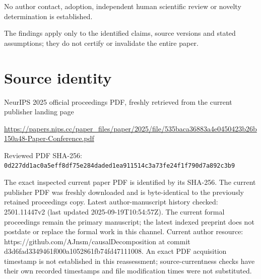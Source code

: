 \documentclass[11pt]{article}
\begin{document}
No author contact, adoption, independent human scientific review or novelty determination is established.\par

The findings apply only to the identified claims, source versions and stated assumptions; they do not certify or invalidate the entire paper.\par

\section*{Source identity}

NeurIPS 2025 official proceedings PDF, freshly retrieved from the current publisher landing page

\url{https://papers.nips.cc/paper_files/paper/2025/file/535baca36883a4e0450423b26b150a48-Paper-Conference.pdf}

Reviewed PDF SHA-256: \nolinkurl{0d227dd1ac0a5eff8df75e284daded1ea911514c3a73fe24f1f790d7a892c3b9}

The exact inspected current paper PDF is identified by its SHA-256. The current publisher PDF was freshly downloaded and is byte-identical to the previously retained proceedings copy. Latest author-manuscript history checked: 2501.11447v2 (last updated 2025-09-19T10:54:57Z). The current formal proceedings remain the primary manuscript; the latest indexed preprint does not postdate or replace the formal work in this channel. Current author resource: https://github.com/AJnsm/causalDecomposition at commit d3d6fad3349461f000a1052861fb74fd47111008.  An exact PDF acquisition timestamp is not established in this reassessment; source-currentness checks have their own recorded timestamps and file modification times were not substituted.
\end{document}
